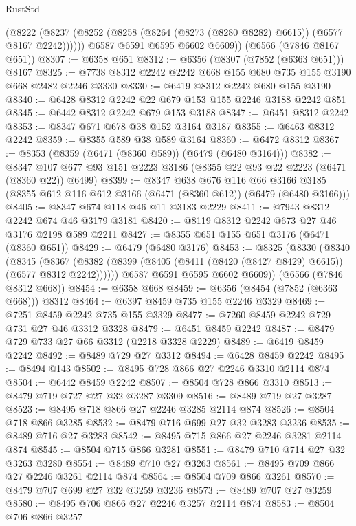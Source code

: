 \begin{lexlean}{RustStd}
\begin{coremodule}
          (@8222 (@8237 (@8252 (@8258 (@8264 (@8273 (@8280 @8282) @6615)) (@6577 @8167 @2242))))))
        @6587
        @6591
        @6595
        @6602
        @6609))
    (@6566 (@7846 @8167 @651))
@8307 := @6358 @651
@8312 := @6356 (@8307 (@7852 (@6363 @651))) @8167
@8325 := @7738 @8312 @2242 @2242 @668 @155 @680 @735 @155 @3190 @668 @2482 @2246 @3330
@8330 := @6419 @8312 @2242 @680 @155 @3190
@8340 := @6428 @8312 @2242 @22 @679 @153 @155 @2246 @3188 @2242 @851
@8345 := @6442 @8312 @2242 @679 @153 @3188
@8347 := @6451 @8312 @2242
@8353 := @8347 @671 @678 @38 @152 @3164 @3187
@8355 := @6463 @8312 @2242
@8359 := @8355 @589 @38 @589 @3164
@8360 := @6472 @8312
@8367 := @8353 (@8359 (@6471 (@8360 @589)) (@6479 (@6480 @3164)))
@8382 := @8347 @107 @677 @93 @151 @2223 @3186 (@8355 @22 @93 @22 @2223 (@6471 (@8360 @22)) @6499)
@8399 := @8347
    @638
    @676
    @116
    @66
    @3166
    @3185
    (@8355 @612 @116 @612 @3166 (@6471 (@8360 @612)) (@6479 (@6480 @3166)))
@8405 := @8347 @674 @118 @46 @11 @3183 @2229
@8411 := @7943 @8312 @2242 @674 @46 @3179 @3181
@8420 := @8119 @8312 @2242 @673 @27 @46 @3176 @2198 @589 @2211
@8427 := @8355 @651 @155 @651 @3176 (@6471 (@8360 @651))
@8429 := @6479 (@6480 @3176)
@8453 := @8325
    (@8330
      (@8340
        (@8345
          (@8367 (@8382 (@8399 (@8405 (@8411 (@8420 (@8427 @8429) @6615)) (@6577 @8312 @2242))))))
        @6587
        @6591
        @6595
        @6602
        @6609))
    (@6566 (@7846 @8312 @668))
@8454 := @6358 @668
@8459 := @6356 (@8454 (@7852 (@6363 @668))) @8312
@8464 := @6397 @8459 @735 @155 @2246 @3329
@8469 := @7251 @8459 @2242 @735 @155 @3329
@8477 := @7260 @8459 @2242 @729 @731 @27 @46 @3312 @3328
@8479 := @6451 @8459 @2242
@8487 := @8479 @729 @733 @27 @66 @3312 (@2218 @3328 @2229)
@8489 := @6419 @8459 @2242
@8492 := @8489 @729 @27 @3312
@8494 := @6428 @8459 @2242
@8495 := @8494 @143
@8502 := @8495 @728 @866 @27 @2246 @3310 @2114 @874
@8504 := @6442 @8459 @2242
@8507 := @8504 @728 @866 @3310
@8513 := @8479 @719 @727 @27 @32 @3287 @3309
@8516 := @8489 @719 @27 @3287
@8523 := @8495 @718 @866 @27 @2246 @3285 @2114 @874
@8526 := @8504 @718 @866 @3285
@8532 := @8479 @716 @699 @27 @32 @3283 @3236
@8535 := @8489 @716 @27 @3283
@8542 := @8495 @715 @866 @27 @2246 @3281 @2114 @874
@8545 := @8504 @715 @866 @3281
@8551 := @8479 @710 @714 @27 @32 @3263 @3280
@8554 := @8489 @710 @27 @3263
@8561 := @8495 @709 @866 @27 @2246 @3261 @2114 @874
@8564 := @8504 @709 @866 @3261
@8570 := @8479 @707 @699 @27 @32 @3259 @3236
@8573 := @8489 @707 @27 @3259
@8580 := @8495 @706 @866 @27 @2246 @3257 @2114 @874
@8583 := @8504 @706 @866 @3257

\end{coremodule}
\end{lexlean}
